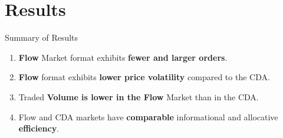 \documentclass[10pt]{beamer}
\begin{document}
\section{Results}

\begin{frame}{Summary of Results}

\begin{enumerate}
    \item[R1:] \textbf{Flow} Market format exhibits \textbf{fewer and larger orders}.  \pause 
    \vspace{0.5cm}
    
    \item[R2:] \textbf{Flow} format exhibits \textbf{lower price volatility} compared to the CDA.  \pause 
    \vspace{0.5cm}
    
    \item[R3:] Traded \textbf{Volume is lower in the Flow} Market than in the CDA.  \pause 
    \vspace{0.5cm}
    
    \item[R4:] Flow and CDA markets have \textbf{comparable} informational and allocative \textbf{efficiency}.  \pause 
    
\end{enumerate}



\end{frame}
\end{document}
